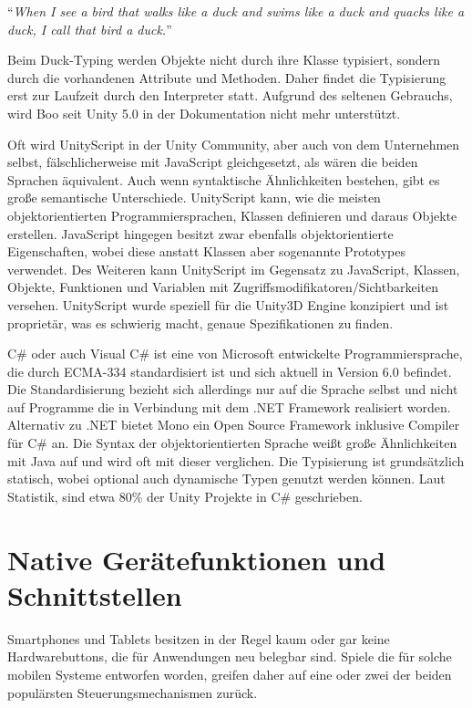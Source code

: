 \medskip
“\emph{When I see a bird that walks like a duck and swims like a duck and quacks like a duck, I call that bird a duck.}” \citep{ducktest}
\medskip

Beim Duck-Typing werden Objekte nicht durch ihre Klasse typisiert, sondern durch die vorhandenen Attribute und Methoden. Daher findet die Typisierung erst zur Laufzeit durch den Interpreter statt. Aufgrund des seltenen Gebrauchs, wird Boo seit Unity 5.0 in der Dokumentation nicht mehr unterstützt.

\medskip
Oft wird UnityScript in der Unity Community, aber auch von dem Unternehmen selbst, fälschlicherweise mit JavaScript gleichgesetzt, als wären die beiden Sprachen äquivalent. Auch wenn syntaktische Ähnlichkeiten bestehen, gibt es große semantische Unterschiede.
UnityScript kann, wie die meisten objektorientierten Programmiersprachen, Klassen definieren und daraus Objekte erstellen. JavaScript hingegen besitzt zwar ebenfalls objektorientierte Eigenschaften, wobei diese anstatt Klassen aber sogenannte Prototypes verwendet. Des Weiteren kann UnityScript im Gegensatz zu JavaScript, Klassen, Objekte, Funktionen und Variablen mit Zugriffsmodifikatoren/Sichtbarkeiten versehen. UnityScript wurde speziell für die Unity3D Engine konzipiert und ist proprietär, was es schwierig macht, genaue Spezifikationen zu finden. \citep{unity_unityscript_vs_javascript}

\medskip
C\# oder auch Visual C\# ist eine von Microsoft entwickelte Programmiersprache, die durch ECMA-334 standardisiert ist und sich aktuell in Version 6.0 befindet. Die Standardisierung bezieht sich allerdings nur auf die Sprache selbst und nicht auf Programme die in Verbindung mit dem .NET Framework realisiert worden. Alternativ zu .NET bietet Mono ein Open Source Framework inklusive Compiler für C\# an. Die Syntax der objektorientierten Sprache weißt große Ähnlichkeiten mit Java auf und wird oft mit dieser verglichen. Die Typisierung ist grundsätzlich statisch, wobei optional auch dynamische Typen genutzt werden können. \citep{csharp_in_depth}
Laut Statistik, sind etwa 80\% der Unity Projekte in C\# geschrieben. \citep{unity_languages}


\section{Native Gerätefunktionen und Schnittstellen}
Smartphones und Tablets besitzen in der Regel kaum oder gar keine Hardwarebuttons, die für Anwendungen neu belegbar sind. Spiele die für solche mobilen Systeme entworfen worden, greifen daher auf eine oder zwei der beiden populärsten Steuerungsmechanismen zurück.

